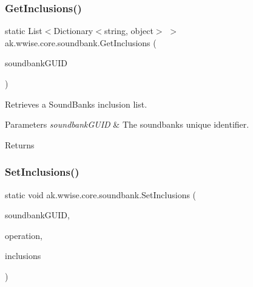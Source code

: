 \subsubsection{\texorpdfstring{Get\+Inclusions()}{GetInclusions()}}
{\footnotesize\ttfamily static List$<$Dictionary$<$string, object$>$ $>$ ak.\+wwise.\+core.\+soundbank.\+Get\+Inclusions (\begin{DoxyParamCaption}\item[{string}]{soundbank\+G\+U\+ID }\end{DoxyParamCaption})\hspace{0.3cm}{\ttfamily [static]}}



Retrieves a Sound\+Bank\textquotesingle{}s inclusion list. 


\begin{DoxyParams}{Parameters}
{\em soundbank\+G\+U\+ID} & The soundbank\textquotesingle{}s unique identifier.\\
\hline
\end{DoxyParams}
\begin{DoxyReturn}{Returns}

\end{DoxyReturn}
\mbox{\label{classak_1_1wwise_1_1core_1_1soundbank_ab076e1bbcb3c0deba565ce44d7b21aa7}} 
\subsubsection{\texorpdfstring{Set\+Inclusions()}{SetInclusions()}}
{\footnotesize\ttfamily static void ak.\+wwise.\+core.\+soundbank.\+Set\+Inclusions (\begin{DoxyParamCaption}\item[{string}]{soundbank\+G\+U\+ID,  }\item[{\mbox{\hyperlink{class_waapi_c_s_1_1_custom_values_1_1_wwise_values_a1b0c0844c7d8ac428022c97feeec0b5f}{Wwise\+Values.\+soundbank\+Operation}}}]{operation,  }\item[{\mbox{\hyperlink{class_waapi_c_s_1_1_custom_values_1_1_wwise_values_1_1_inclusion_object}{Wwise\+Values.\+Inclusion\+Object}} \mbox{[}$\,$\mbox{]}}]{inclusions }\end{DoxyParamCaption})\hspace{0.3cm}{\ttfamily [static]}}



